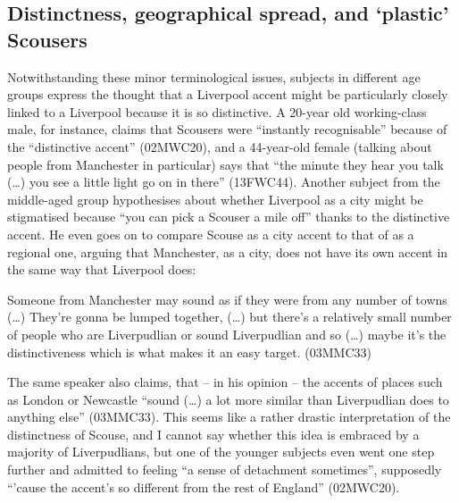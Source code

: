 \subsection{Distinctness, geographical spread, and `plastic' Scousers}

Notwithstanding these minor terminological issues, subjects in different age groups express the thought that a Liverpool accent might be particularly closely linked to a Liverpool  because it is so distinctive.
A 20-year old working-class male, for instance, claims that Scousers were ``instantly recognisable'' because of the ``distinctive accent'' (02MWC20), and a 44-year-old female (talking about people from Manchester in particular) says that ``the minute they hear you talk (\ldots) you see a little light go on in there'' (13FWC44).
Another subject from the middle-aged group hypothesises about whether Liverpool as a city might be stigmatised because ``you can pick a Scouser a mile off'' thanks to the distinctive accent.
He even goes on to compare Scouse as a city accent to that of  as a regional one, arguing that Manchester, as a city, does not have its own accent in the same way that Liverpool does:

\begin{example}
	Someone from Manchester may sound as if they were from any number of towns (\ldots) They're gonna be lumped together, (\ldots) but there's a relatively small number of people who are Liverpudlian or sound Liverpudlian and so (\ldots) maybe it's the distinctiveness which is what makes it an easy target. (03MMC33)
\end{example}

The same speaker also claims, that -- in his opinion -- the accents of places such as London or Newcastle ``sound (\ldots) a lot more similar than Liverpudlian does to anything else'' (03MMC33).
This seems like a rather drastic interpretation of the distinctness of Scouse, and I cannot say whether this idea is embraced by a majority of Liverpudlians, but one of the younger subjects even went one step further and admitted to feeling ``a sense of detachment sometimes'', supposedly ``'cause the accent's so different from the rest of England'' (02MWC20).

